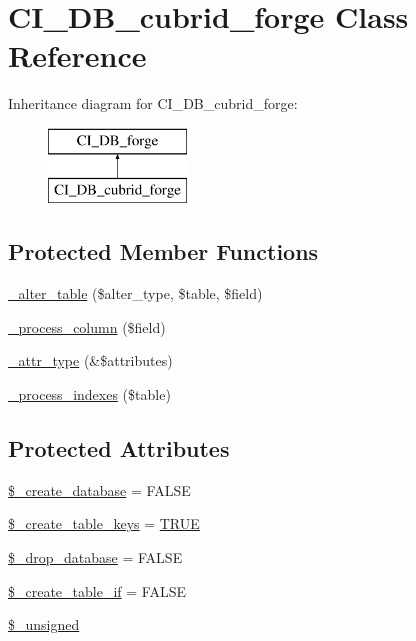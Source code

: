 \hypertarget{class_c_i___d_b__cubrid__forge}{}\section{C\+I\+\_\+\+D\+B\+\_\+cubrid\+\_\+forge Class Reference}
\label{class_c_i___d_b__cubrid__forge}
Inheritance diagram for C\+I\+\_\+\+D\+B\+\_\+cubrid\+\_\+forge\+:\begin{figure}[H]
\begin{center}
\leavevmode
\includegraphics[height=2.000000cm]{class_c_i___d_b__cubrid__forge}
\end{center}
\end{figure}
\subsection*{Protected Member Functions}
\begin{DoxyCompactItemize}
\item 
\mbox{\hyperlink{class_c_i___d_b__cubrid__forge_a41c6cae02f2fda8b429ad0afb9509426}{\+\_\+alter\+\_\+table}} (\$alter\+\_\+type, \$table, \$field)
\item 
\mbox{\hyperlink{class_c_i___d_b__cubrid__forge_a8f38f1c5b5dddecca4befbe393f3f299}{\+\_\+process\+\_\+column}} (\$field)
\item 
\mbox{\hyperlink{class_c_i___d_b__cubrid__forge_a8553be952084c6f7cdfff370a1d14f6b}{\+\_\+attr\+\_\+type}} (\&\$attributes)
\item 
\mbox{\hyperlink{class_c_i___d_b__cubrid__forge_ae0bdb4ea3418590d1894c5b621b5ca50}{\+\_\+process\+\_\+indexes}} (\$table)
\end{DoxyCompactItemize}
\subsection*{Protected Attributes}
\begin{DoxyCompactItemize}
\item 
\mbox{\hyperlink{class_c_i___d_b__cubrid__forge_acd23c9a8735806155f1a5d0a87c151f2}{\$\+\_\+create\+\_\+database}} = F\+A\+L\+SE
\item 
\mbox{\hyperlink{class_c_i___d_b__cubrid__forge_a73e07acdd35c948ad353903c2827af6e}{\$\+\_\+create\+\_\+table\+\_\+keys}} = \mbox{\hyperlink{constants_8php_ae04a3efe6aa42044f803ee90c2277846}{T\+R\+UE}}
\item 
\mbox{\hyperlink{class_c_i___d_b__cubrid__forge_a8305b12fc17f6f87778260ebdff287b4}{\$\+\_\+drop\+\_\+database}} = F\+A\+L\+SE
\item 
\mbox{\hyperlink{class_c_i___d_b__cubrid__forge_a2f6484fcb8d1dc3eef67a637227cd583}{\$\+\_\+create\+\_\+table\+\_\+if}} = F\+A\+L\+SE
\item 
\mbox{\hyperlink{class_c_i___d_b__cubrid__forge_aae977ae6d61fa183f0b25422b6ddc31c}{\$\+\_\+unsigned}}
\end{DoxyCompactItemize}
